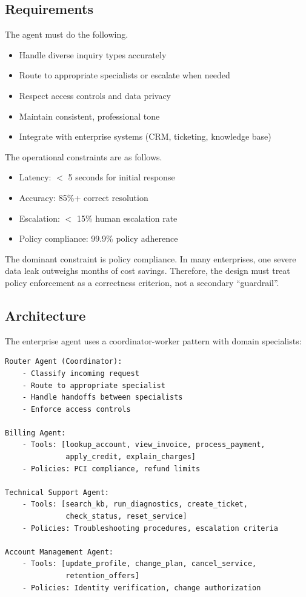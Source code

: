 \subsection{Requirements}

The agent must do the following.
\begin{itemize}
\item Handle diverse inquiry types accurately
\item Route to appropriate specialists or escalate when needed
\item Respect access controls and data privacy
\item Maintain consistent, professional tone
\item Integrate with enterprise systems (CRM, ticketing, knowledge base)
\end{itemize}

The operational constraints are as follows.
\begin{itemize}
\item Latency: $<$ 5 seconds for initial response
\item Accuracy: 85\%+ correct resolution
\item Escalation: $<$ 15\% human escalation rate
\item Policy compliance: 99.9\% policy adherence
\end{itemize}

The dominant constraint is policy compliance. In many enterprises, one severe data leak outweighs months of cost savings. Therefore, the design must treat policy enforcement as a correctness criterion, not a secondary ``guardrail''.

\subsection{Architecture}

The enterprise agent uses a coordinator-worker pattern with domain specialists:

{\footnotesize
\begin{verbatim}
Router Agent (Coordinator):
    - Classify incoming request
    - Route to appropriate specialist
    - Handle handoffs between specialists
    - Enforce access controls

Billing Agent:
    - Tools: [lookup_account, view_invoice, process_payment,
              apply_credit, explain_charges]
    - Policies: PCI compliance, refund limits
    
Technical Support Agent:
    - Tools: [search_kb, run_diagnostics, create_ticket,
              check_status, reset_service]
    - Policies: Troubleshooting procedures, escalation criteria
    
Account Management Agent:
    - Tools: [update_profile, change_plan, cancel_service,
              retention_offers]
    - Policies: Identity verification, change authorization
\end{verbatim}
}

